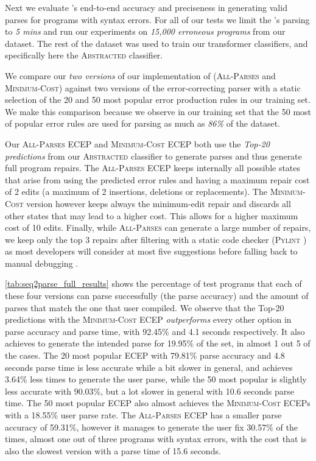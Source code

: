 Next we evaluate \toolname's end-to-end accuracy and preciseness in generating
valid parses for programs with syntax errors. For all of our tests we limit the
\toolname's parsing to \emph{5 mins} and run our experiments on \emph{15,000
erroneous programs} from our dataset. The rest of the dataset was used to train
our transformer classifiers, and specifically here the \textsc{Abstracted}
classifier.

We compare our \emph{two versions} of our implementation of \toolname
(\textsc{All-Parses} and \textsc{Minimum-Cost}) against two versions of the
error-correcting parser with a static selection of the 20 and 50 most popular
error production rules in our training set. We make this comparison because we
observe in our training set that the 50 most of popular error rules are used for
parsing as much as \emph{86\%} of the dataset.

Our \textsc{All-Parses} ECEP and \textsc{Minimum-Cost} ECEP both use the
\emph{Top-20 predictions} from our \textsc{Abstracted} classifier to generate
parses and thus generate full program repairs. The \textsc{All-Parses} ECEP
keeps internally all possible states that arise from using the predicted error
rules and having a maximum repair cost of 2 edits (\ie a maximum of 2
insertions, deletions or replacements). The \textsc{Minimum-Cost} version
however keeps always the minimum-edit repair and discards all other states that
may lead to a higher cost. This allows for a higher maximum cost of 10 edits.
Finally, while \textsc{All-Parses} can generate a large number of repairs, we
keep only the top 3 repairs after filtering with a static code checker
(\textsc{Pylint} \citep{pylint2022}) as most developers will consider at most five
suggestions before falling back to manual debugging \citep{Kochhar2016-oc,
Parnin2011-ce}.

\autoref{tab:seq2parse_full_results} shows the percentage of test programs that
each of these four versions can parse successfully (\ie the parse accuracy) and
the amount of parses that match the one that user compiled. We observe that the
Top-20 predictions with the \textsc{Minimum-Cost} ECEP \emph{outperforms} every
other option in parse accuracy and parse time, with 92.45\% and 4.1 seconds
respectively. It also achieves to generate the intended parse for 19.95\% of the
set, \ie in almost 1 out 5 of the cases. The 20 most popular ECEP with 79.81\%
parse accuracy and 4.8 seconds parse time is less accurate while a bit slower in
general, and achieves 3.64\% less times to generate the user parse, while the 50
most popular is slightly less accurate with 90.03\%, but a lot slower in general
with 10.6 seconds parse time. The 50 most popular ECEP also almost achieves the
\textsc{Minimum-Cost} ECEPs with a 18.55\% user parse rate. The
\textsc{All-Parses} ECEP has a smaller parse accuracy of 59.31\%, however it
manages to generate the user fix 30.57\% of the times, \ie almost one out of
three programs with syntax errors, with the cost that is also the slowest
version with a parse time of 15.6 seconds.

